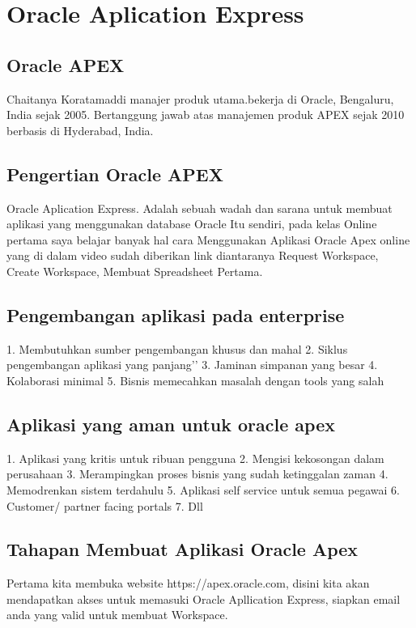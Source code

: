 \chapter{Oracle Aplication Express}

\section{Oracle APEX}
Chaitanya Koratamaddi manajer produk utama.bekerja di Oracle, Bengaluru, India sejak 2005. Bertanggung jawab atas manajemen produk APEX sejak 2010 berbasis di Hyderabad, India.

\section{Pengertian Oracle APEX}
Oracle Aplication Express\cite{OracleApex}. Adalah sebuah wadah dan sarana untuk membuat aplikasi yang menggunakan database Oracle Itu sendiri, pada kelas Online pertama saya belajar banyak hal cara Menggunakan Aplikasi Oracle Apex online yang di dalam video sudah diberikan link diantaranya Request Workspace, Create Workspace, Membuat Spreadsheet Pertama.

\section{Pengembangan aplikasi pada enterprise}
1.	Membutuhkan sumber pengembangan khusus dan mahal
2.	Siklus pengembangan aplikasi yang panjang’’
3.	Jaminan simpanan yang besar
4.	Kolaborasi minimal
5.	Bisnis memecahkan masalah dengan tools yang salah

\section{Aplikasi yang aman untuk oracle apex}
1.	Aplikasi yang kritis untuk ribuan pengguna
2.	Mengisi kekosongan dalam perusahaan
3.	Merampingkan proses bisnis yang sudah ketinggalan zaman
4.	Memodrenkan sistem terdahulu
5.	Aplikasi self service untuk semua pegawai
6.	Customer/ partner facing portals
7.	Dll

\section{Tahapan Membuat Aplikasi Oracle Apex}
Pertama kita membuka website https://apex.oracle.com, disini kita akan mendapatkan akses untuk memasuki Oracle Apllication Express, siapkan email anda yang valid untuk membuat Workspace. 

